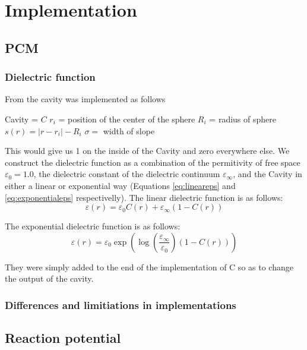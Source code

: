 \documentclass[../master_thesis.tex]{subfiles}
\begin{document}
\chapter{Implementation}
\section{PCM}
\subsection{Dielectric function}
From \cite{FossoTande:2013ka} the cavity was implemented as follows

\begin{algorithm}[H]
  Cavity = $C$\;
  $r_i$ = position of the center of the sphere\;
  $R_i$ = radius of sphere\;
  $s(r) = |r - r_i| - R_i$\;
  $\sigma =$ width of slope \;
  \
\end{algorithm}
This would give us 1 on the inside of the Cavity and zero everywhere else. We
construct the dielectric function as a combination of the permitivity of free
space $\varepsilon_0 = 1.0$, the dielectric constant of the dielectric continuum
$\varepsilon_{\infty}$, and the Cavity in either a linear or exponential way \cite{FossoTande:2013ka} (Equations
\ref{eq:lineareps} and \ref{eq:exponentialeps} respectivelly). The linear
dielectric function is as follows:
\begin{equation}
  \varepsilon(r) = \varepsilon_0C(r) + \varepsilon_{\infty}(1 - C(r))\label{eq:lineareps}
\end{equation}

The exponential dielectric function is as follows:
\begin{equation}
  \varepsilon(r) = \varepsilon_0\exp(\log(\frac{\varepsilon_{\infty}}{\varepsilon_0})(1 - C(r)))\label{eq:exponentialeps}
\end{equation}

They were simply added to the end of the implementation of C so as to change the output of the cavity.

\subsection{Differences and limitiations in implementations}

\section{Reaction potential}
\end{document}

